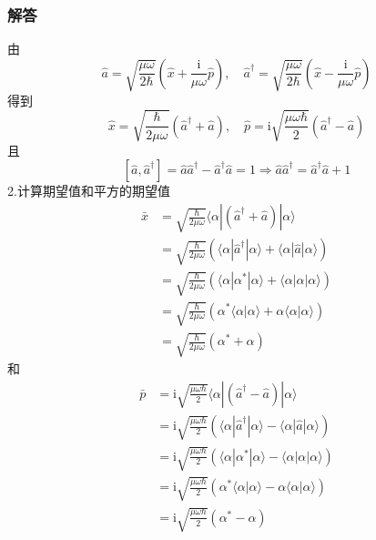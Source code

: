 \subsubsection{解答}
由
\begin{equation}
    \hat{a}=\sqrt{\frac{\mu \omega}{2\hbar}}\left( \hat{x}+\frac{\mathrm{i}}{\mu \omega}\hat{p} \right) ,\quad \hat{a}^{\dagger}=\sqrt{\frac{\mu \omega}{2\hbar}}\left( \hat{x}-\frac{\mathrm{i}}{\mu \omega}\hat{p} \right) 
\end{equation}
得到
\begin{equation}
    \hat{x}=\sqrt{\frac{\hbar}{2\mu \omega}}\left( \hat{a}^{\dagger}+\hat{a} \right) ,\quad \hat{p}=\mathrm{i}\sqrt{\frac{\mu \omega \hbar}{2}}\left( \hat{a}^{\dagger}-\hat{a} \right) 
\end{equation}
且
\begin{equation}
    \left[ \hat{a},\hat{a}^{\dagger} \right] =\hat{a}\hat{a}^{\dagger}-\hat{a}^{\dagger}\hat{a}=1\Rightarrow \hat{a}\hat{a}^{\dagger}=\hat{a}^{\dagger}\hat{a}+1
\end{equation}
2.计算期望值和平方的期望值
\begin{equation}
    \begin{aligned}
        \bar{x}&=\sqrt{\frac{\hbar}{2\mu \omega}}\langle \alpha |\left( \hat{a}^{\dagger}+\hat{a} \right) |\alpha \rangle 
\\
&=\sqrt{\frac{\hbar}{2\mu \omega}}\left( \langle \alpha |\hat{a}^{\dagger}|\alpha \rangle +\langle \alpha |\hat{a}|\alpha \rangle \right) 
\\
&=\sqrt{\frac{\hbar}{2\mu \omega}}\left( \langle \alpha |\alpha ^*|\alpha \rangle +\langle \alpha |\alpha |\alpha \rangle \right) 
\\
&=\sqrt{\frac{\hbar}{2\mu \omega}}\left( \alpha ^*\langle \alpha |\alpha \rangle +\alpha \langle \alpha |\alpha \rangle \right) 
\\
&=\sqrt{\frac{\hbar}{2\mu \omega}}\left( \alpha ^*+\alpha \right) 
    \end{aligned}
\end{equation}
和
\begin{equation}
    \begin{aligned}
        \bar{p}&=\mathrm{i}\sqrt{\frac{\mu \omega \hbar}{2}}\langle \alpha |\left( \hat{a}^{\dagger}-\hat{a} \right) |\alpha \rangle 
\\
&=\mathrm{i}\sqrt{\frac{\mu \omega \hbar}{2}}\left( \langle \alpha |\hat{a}^{\dagger}|\alpha \rangle -\langle \alpha |\hat{a}|\alpha \rangle \right) 
\\
&=\mathrm{i}\sqrt{\frac{\mu \omega \hbar}{2}}\left( \langle \alpha |\alpha ^*|\alpha \rangle -\langle \alpha |\alpha |\alpha \rangle \right) 
\\
&=\mathrm{i}\sqrt{\frac{\mu \omega \hbar}{2}}\left( \alpha ^*\langle \alpha |\alpha \rangle -\alpha \langle \alpha |\alpha \rangle \right) 
\\
&=\mathrm{i}\sqrt{\frac{\mu \omega \hbar}{2}}\left( \alpha ^*-\alpha \right) 
    \end{aligned}
\end{equation}
